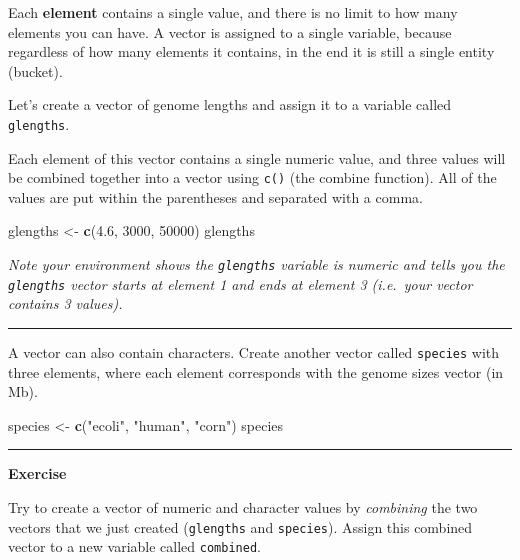 \documentclass[
]{article}
\newenvironment{Shaded}{\begin{snugshade}}{\end{snugshade}}
\newcommand{\DecValTok}[1]{\textcolor[rgb]{0.00,0.00,0.81}{#1}}
\newcommand{\FloatTok}[1]{\textcolor[rgb]{0.00,0.00,0.81}{#1}}
\newcommand{\KeywordTok}[1]{\textcolor[rgb]{0.13,0.29,0.53}{\textbf{#1}}}
\newcommand{\NormalTok}[1]{#1}
\newcommand{\StringTok}[1]{\textcolor[rgb]{0.31,0.60,0.02}{#1}}
\begin{document}
Each \textbf{element} contains a single value, and there is no limit to
how many elements you can have. A vector is assigned to a single
variable, because regardless of how many elements it contains, in the
end it is still a single entity (bucket).

Let's create a vector of genome lengths and assign it to a variable
called \texttt{glengths}.

Each element of this vector contains a single numeric value, and three
values will be combined together into a vector using \texttt{c()} (the
combine function). All of the values are put within the parentheses and
separated with a comma.

\begin{Shaded}
\begin{Highlighting}[]
\NormalTok{glengths <-}\StringTok{ }\KeywordTok{c}\NormalTok{(}\FloatTok{4.6}\NormalTok{, }\DecValTok{3000}\NormalTok{, }\DecValTok{50000}\NormalTok{)}
\NormalTok{glengths}
\end{Highlighting}
\end{Shaded}

\emph{Note your environment shows the \texttt{glengths} variable is
numeric and tells you the \texttt{glengths} vector starts at element 1
and ends at element 3 (i.e.~your vector contains 3 values).}

\begin{center}\rule{0.5\linewidth}{0.5pt}\end{center}

A vector can also contain characters. Create another vector called
\texttt{species} with three elements, where each element corresponds
with the genome sizes vector (in Mb).

\begin{Shaded}
\begin{Highlighting}[]
\NormalTok{species <-}\StringTok{ }\KeywordTok{c}\NormalTok{(}\StringTok{"ecoli"}\NormalTok{, }\StringTok{"human"}\NormalTok{, }\StringTok{"corn"}\NormalTok{)}
\NormalTok{species}
\end{Highlighting}
\end{Shaded}

\begin{center}\rule{0.5\linewidth}{0.5pt}\end{center}

\textbf{Exercise}

Try to create a vector of numeric and character values by
\emph{combining} the two vectors that we just created (\texttt{glengths}
and \texttt{species}). Assign this combined vector to a new variable
called \texttt{combined}.
\end{document}
